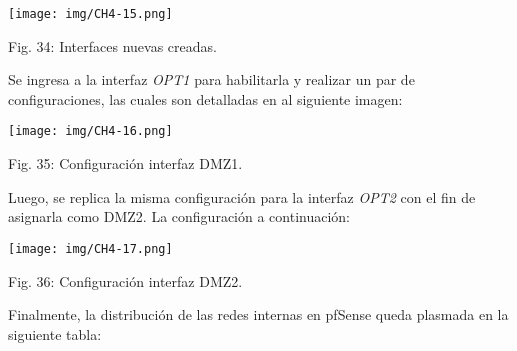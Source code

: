 \documentclass[12pt,oneside,a4paper]{book}
\begin{document}
\vspace{2em}

\begin{center}
    \texttt{[image: img/CH4-15.png]}
    
\vspace{0.1em}
    
    Fig. 34: Interfaces nuevas creadas.
\end{center}

\vspace{2em}

\hspace{20pt}
Se ingresa a la interfaz \textit{OPT1} para habilitarla y realizar un par de configuraciones, las cuales son detalladas en al siguiente imagen:

\vspace{2em}

\begin{center}
    \texttt{[image: img/CH4-16.png]}
    
\vspace{0.1em}
    
    Fig. 35: Configuración interfaz DMZ1.
\end{center}

\vspace{2em}

\hspace{20pt}
Luego, se replica la misma configuración para la interfaz \textit{OPT2} con el fin de asignarla como DMZ2. La configuración a continuación:

\vspace{2em}

\begin{center}
    \texttt{[image: img/CH4-17.png]}
    
\vspace{0.1em}
    
    Fig. 36: Configuración interfaz DMZ2.
\end{center}

\vspace{2em}

\hspace{20pt}
Finalmente, la distribución de las redes internas en pfSense queda plasmada en la siguiente tabla:

\vspace{2em}
\end{document}
